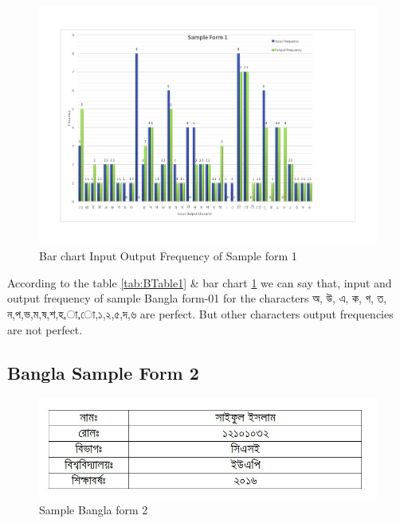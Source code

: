 \begin{figure}[H]
\centering
\includegraphics[width=1\textwidth]{Bform1.pdf}
\caption {Bar chart Input Output Frequency of Sample form 1}
\label {fig:Bbar1}
\end{figure}


According to the table \ref{tab:BTable1} \& bar chart \ref{fig:Bbar1} we can say that, input and output frequency of sample Bangla form-01 for the characters {\bengalifont অ}, {\bengalifont উ}, {\bengalifont এ}, {\bengalifont ক}, {\bengalifont গ}, {\bengalifont ত}, {\bengalifont ন},{\bengalifont প},{\bengalifont ভ},{\bengalifont ম},{\bengalifont ষ},{\bengalifont শ},{\bengalifont হ},{\bengalifont া},{\bengalifont ো},{\bengalifont ১},{\bengalifont ২},{\bengalifont ৫},{\bengalifont দ},{\bengalifont ৬} are perfect. But other characters output frequencies are not perfect.

\subsection{Bangla Sample Form 2}
\begin{figure}[H]
\centering
\includegraphics[width=1\textwidth]{formBen02.JPG}
\caption {Sample Bangla form 2}
\label {fig:FormBan2}
\end{figure}

